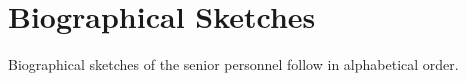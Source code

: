 
\chapter{Biographical Sketches}
\label{sec:bios}

\noindent
Biographical sketches of the senior personnel follow in alphabetical
order.  

\minitoc

\newpage

\newpage
{}
\newpage
{}
\newpage
